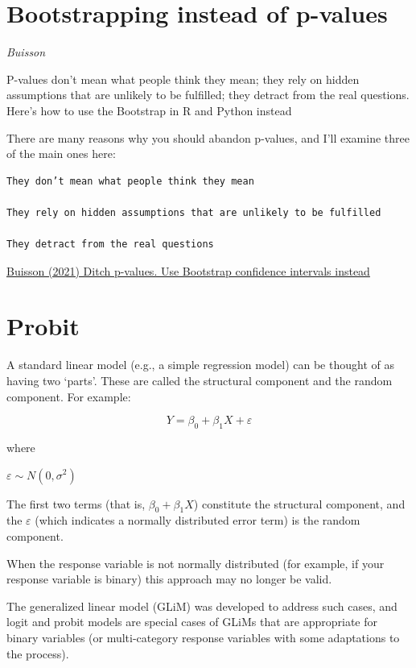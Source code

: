 \documentclass[
]{book}
\begin{document}
\hypertarget{bootstrapping-instead-of-p-values}{%
\section{Bootstrapping instead of p-values}\label{bootstrapping-instead-of-p-values}}

\emph{Buisson}

P-values don't mean what people think they mean; they rely on hidden assumptions that are unlikely to be fulfilled; they detract from the real questions. Here's how to use the Bootstrap in R and Python instead

There are many reasons why you should abandon p-values, and I'll examine three of the main ones here:

\begin{verbatim}
They don’t mean what people think they mean

They rely on hidden assumptions that are unlikely to be fulfilled

They detract from the real questions
\end{verbatim}

\href{https://towardsdatascience.com/ditch-p-values-use-bootstrap-confidence-intervals-instead-bba56322b522}{Buisson (2021) Ditch p-values. Use Bootstrap confidence intervals instead}

\hypertarget{probit}{%
\section{Probit}\label{probit}}

A standard linear model (e.g., a simple regression model) can be thought of as having two `parts'.
These are called the structural component and the random component.
For example:

\[Y=β_0+β_1 X+ε\]

where

\(ε∼N(0,σ^2)\)

The first two terms (that is, \(β_0 + β_1 X\)) constitute the structural component,
and the \(ε\) (which indicates a normally distributed error term) is the random component.

When the response variable is not normally distributed
(for example, if your response variable is binary) this approach may no longer be valid.

The generalized linear model (GLiM) was developed to address such cases,
and logit and probit models are special cases of GLiMs that are appropriate for binary variables
(or multi-category response variables with some adaptations to the process).
\end{document}
